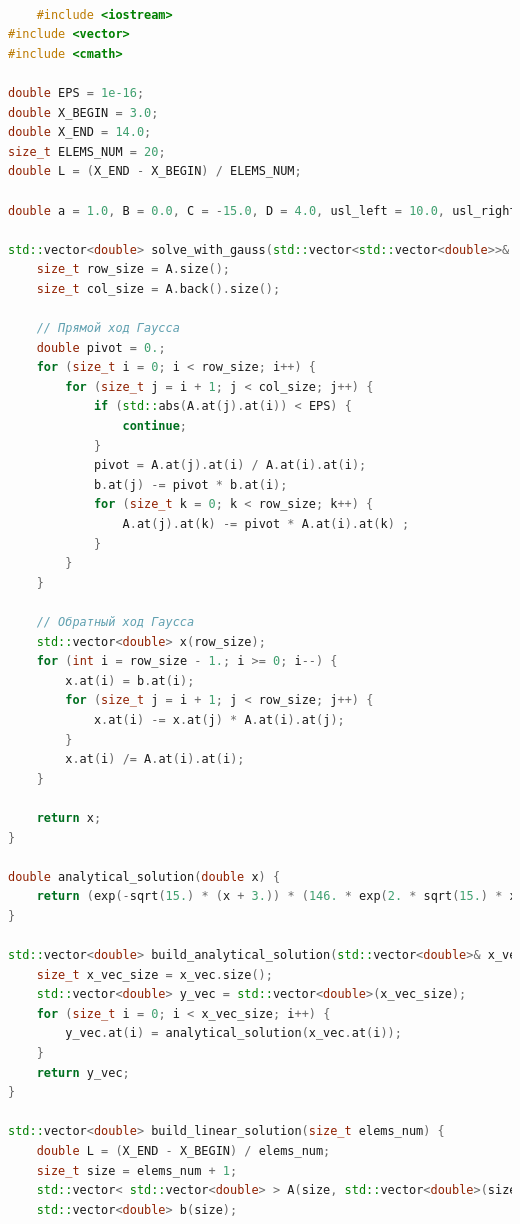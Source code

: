 \begin{lstlisting}[language=c++, label=prog,caption={\textit{Реализация МКЭ}}]

	#include <iostream>
#include <vector>
#include <cmath>

double EPS = 1e-16;
double X_BEGIN = 3.0;
double X_END = 14.0;
size_t ELEMS_NUM = 20;
double L = (X_END - X_BEGIN) / ELEMS_NUM;

double a = 1.0, B = 0.0, C = -15.0, D = 4.0, usl_left = 10.0, usl_right = 1.0; // au"+Bu'+Cu+D=0

std::vector<double> solve_with_gauss(std::vector<std::vector<double>>& A, std::vector<double>& b){
    size_t row_size = A.size();
    size_t col_size = A.back().size();

    // Прямой ход Гаусса
    double pivot = 0.;
    for (size_t i = 0; i < row_size; i++) {
        for (size_t j = i + 1; j < col_size; j++) {
            if (std::abs(A.at(j).at(i)) < EPS) {
                continue;
            }
            pivot = A.at(j).at(i) / A.at(i).at(i);
            b.at(j) -= pivot * b.at(i);
            for (size_t k = 0; k < row_size; k++) {
                A.at(j).at(k) -= pivot * A.at(i).at(k) ;
            }
        }
    }

    // Обратный ход Гаусса
    std::vector<double> x(row_size);
    for (int i = row_size - 1.; i >= 0; i--) {
        x.at(i) = b.at(i);
        for (size_t j = i + 1; j < row_size; j++) {
            x.at(i) -= x.at(j) * A.at(i).at(j);
        }
        x.at(i) /= A.at(i).at(i);
    }

    return x;
}

double analytical_solution(double x) {
    return (exp(-sqrt(15.) * (x + 3.)) * (146. * exp(2. * sqrt(15.) * x) + 4. * exp(sqrt(15.) * (x + 3.)) + 4. * exp(sqrt(15.) * (x + 25.)) + sqrt(15) * exp(sqrt(15.) * (2. * x + 11.)) - sqrt(15.) * exp(17. * sqrt(15.)) + 146. * exp(28. * sqrt(15.)))) / (15. * (1. + exp(22. * sqrt(15.))));
}

std::vector<double> build_analytical_solution(std::vector<double>& x_vec) {
    size_t x_vec_size = x_vec.size();
    std::vector<double> y_vec = std::vector<double>(x_vec_size);
    for (size_t i = 0; i < x_vec_size; i++) {
        y_vec.at(i) = analytical_solution(x_vec.at(i));
    }
    return y_vec;
}

std::vector<double> build_linear_solution(size_t elems_num) {
    double L = (X_END - X_BEGIN) / elems_num;
    size_t size = elems_num + 1;
    std::vector< std::vector<double> > A(size, std::vector<double>(size));
    std::vector<double> b(size);


\end{lstlisting}
